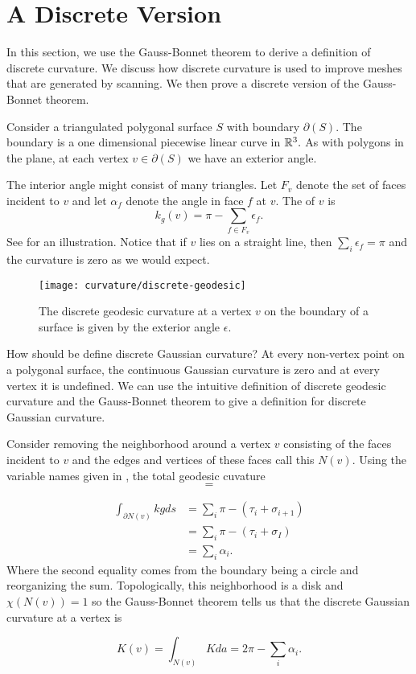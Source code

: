 \section{A Discrete Version}
\label{sec:discrete}

In this section, we use the Gauss-Bonnet theorem to derive
a definition of discrete curvature. We discuss how discrete curvature
is used to improve meshes that are generated by scanning.
We then prove a discrete version of the Gauss-Bonnet theorem.

Consider a triangulated polygonal surface $S$ with boundary $\partial(S)$.
The boundary is a one dimensional piecewise linear curve in $\mathbb{R}^3.$
As with polygons in the plane, at each vertex $v\in \partial(S)$ 
we have an exterior angle.

The interior angle might consist of many triangles.
Let $F_v$  denote the set of faces incident to $v$ and let
$\alpha_f$ denote the angle in face $f$ at $v$.
The 
of $v$  is
$$k_{g}(v)= \pi-\sum_{f\in F_v}\epsilon_f.$$
See  for an illustration.
Notice that if $v$ lies on a straight line, then $\sum_{i}\epsilon_f=\pi$
and the curvature is zero as we would expect.


\begin{figure}[htb]
\centering
	\texttt{[image: curvature/discrete-geodesic]}
	\caption{The discrete geodesic curvature at a vertex $v$ on the boundary
	of a surface is given by the exterior angle $\epsilon$.}
	\label{fig:discrete-geodesic}
\end{figure}

How should be define discrete Gaussian curvature?
At every non-vertex point on a polygonal surface, the continuous Gaussian curvature
is zero and at every vertex it is undefined.
We can use the intuitive definition of discrete geodesic curvature and the Gauss-Bonnet
theorem to give a definition for discrete Gaussian curvature.

Consider removing the neighborhood around a vertex $v$ consisting
of the faces incident to $v$ and the edges and vertices of these faces call
this $N(v)$.
Using the variable names given in ,
the total geodesic cuvature
$$=$$

\begin{align}
\int_{\partial N(v)} kg ds &=\sum_i \pi -(\tau_i+\sigma_{i+1})\nonumber  \\
       &=\sum_i \pi -(\tau_i+\sigma_{I}) \nonumber  \\
       &=\sum_i \alpha_i. \nonumber 
\end{align}
Where the second equality comes from the boundary being a circle and reorganizing the sum.
Topologically, this neighborhood is a disk and $\chi(N(v))=1$
so the Gauss-Bonnet theorem tells us that 
the discrete Gaussian curvature at a vertex is
\begin{definition}\label{def:discrete-curvature-vertex}

$$K(v)=\int_{N(v)}K da=2\pi-\sum_i \alpha_i.$$

\end{definition}

